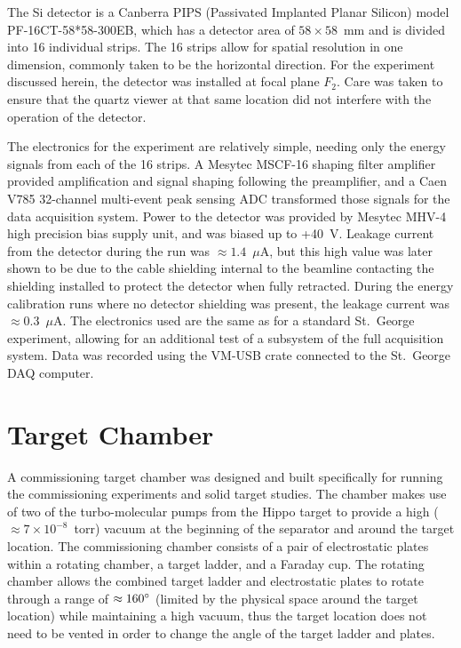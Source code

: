 The Si detector is a Canberra PIPS (Passivated Implanted Planar Silicon)
model PF-16CT-58*58-300EB, which has a detector area of $58\times 58$~mm
and is divided into 16 individual strips. The 16 strips allow for
spatial resolution in one dimension, commonly taken to be the horizontal
direction. For the experiment discussed herein, the detector was
installed at focal plane $F_2$. Care was taken to ensure that the quartz
viewer at that same location did not interfere with the operation of the
detector.

The electronics for the experiment are relatively simple, needing only
the energy signals from each of the 16 strips. A Mesytec MSCF-16 shaping
filter amplifier provided amplification and signal shaping following the
preamplifier, and a Caen V785 32-channel multi-event peak sensing ADC
transformed those signals for the data acquisition system. Power to the
detector was provided by Mesytec MHV-4 high precision bias supply unit,
and was biased up to +40~V. Leakage current from the detector during the
run was $\approx 1.4$~$\mu$A, but this high value was later shown to be
due to the cable shielding internal to the beamline contacting the
shielding installed to protect the detector when fully retracted. During
the energy calibration runs where no detector shielding was present, the
leakage current was $\approx 0.3$~$\mu$A. The electronics used are the
same as for a standard St.\ George experiment, allowing for an
additional test of a subsystem of the full acquisition system. Data was
recorded using the VM-USB crate connected to the St.\ George DAQ
computer.


\section{Target Chamber}
\label{sec:target}

A commissioning target chamber was designed and built specifically for
running the commissioning experiments and solid target studies. The
chamber makes use of two of the turbo-molecular pumps from the Hippo
target to provide a high ($\approx 7\times 10^{-8}$~torr) vacuum at the
beginning of the separator and around the target location. The
commissioning chamber consists of a pair of electrostatic plates within
a rotating chamber, a target ladder, and a Faraday cup. The rotating
chamber allows the combined target ladder and electrostatic plates to
rotate through a range of $\approx 160\degree$ (limited by the physical
space around the target location) while maintaining a high vacuum, thus
the target location does not need to be vented in order to change the
angle of the target ladder and plates.

